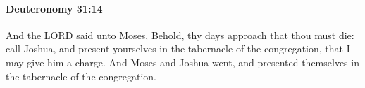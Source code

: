 
		\paragraph{Deuteronomy 31:14} %
			\label{DEUTERONOMY-31-14}

			And the LORD said unto Moses, Behold, thy days approach that thou must die: call Joshua, and present yourselves in the tabernacle of the congregation, that I may give him a charge. And Moses and Joshua went, and presented themselves in the tabernacle of the congregation.


